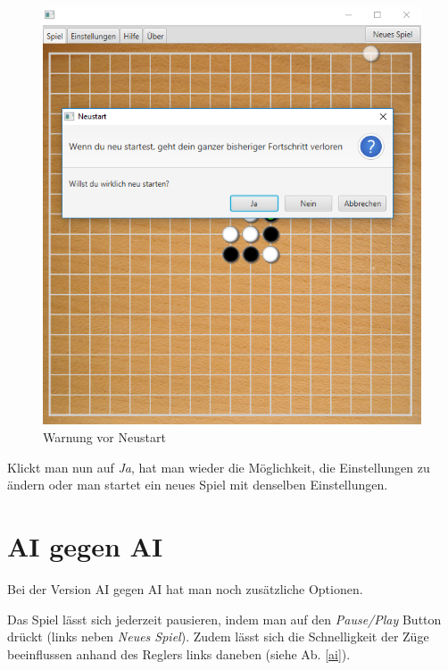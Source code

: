 \documentclass[11pt]{article}
\newcommand{\1}{{\mathds{1}}}
\newcommand{\imagewidth}{.4\textheight}%
\begin{document}
	\begin{figure}[h]
		\centering
		\includegraphics[width=\imagewidth]{warnung.png}
		\caption{Warnung vor Neustart}
		\label{warnung}
	\end{figure}
	
	Klickt man nun auf \textit{Ja}, hat man wieder die Möglichkeit, die Einstellungen zu ändern oder man startet ein neues Spiel mit denselben Einstellungen. 
	
	\FloatBarrier
	\section{AI gegen AI}
	\FloatBarrier
	
	Bei der Version AI gegen AI hat man noch zusätzliche Optionen. 
	
	Das Spiel lässt sich jederzeit pausieren, indem man auf den \textit{Pause/Play} Button drückt (links neben \textit{Neues Spiel}).
	Zudem lässt sich die Schnelligkeit der Züge beeinflussen anhand des Reglers links daneben (siehe Ab. \ref{ai}).
	
\end{document}
